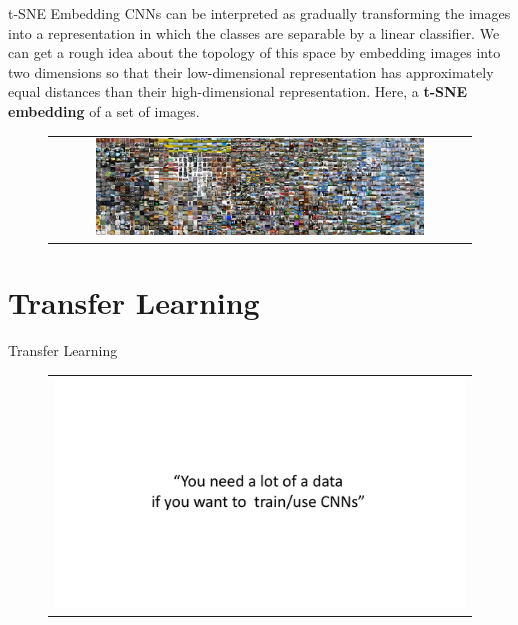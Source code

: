 \documentclass[aspectratio=169]{beamer}
\begin{document}
\begin{frame}{t-SNE Embedding}
CNNs can be interpreted as gradually transforming the images into a representation in which the classes are separable by a linear classifier. We can get a rough idea about the topology of this space by embedding images into two dimensions so that their low-dimensional representation has approximately equal distances than their high-dimensional representation. Here, a \textbf{t-SNE embedding} of a set of images.
\begin{figure}
\begin{tabular}{c}
\includegraphics[width=0.8\textwidth]{img/cnn/tsne.jpg}
\end{tabular}
\end{figure}
\end{frame}


\section{Transfer Learning}


\begin{frame}{Transfer Learning}
\vspace{-1cm}
\begin{figure}
\begin{tabular}{c}
\includegraphics[width=\textwidth]{img/cnn/busted_0.pdf}
\end{tabular}
\end{figure}
\end{frame}
\end{document}
